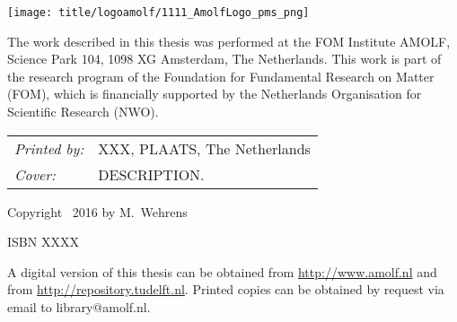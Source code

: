 \begin{titlepage}
\texttt{[image: title/logoamolf/1111\_AmolfLogo\_pms\_png]}


\noindent The work described in this thesis was performed at the FOM Institute AMOLF, Science Park 104, 1098 XG Amsterdam, The Netherlands. This work is part of the research program of the Foundation for Fundamental Research on Matter (FOM), which is financially supported by the Netherlands Organisation for Scientific Research (NWO). 

\vspace{2\bigskipamount}

\noindent
\begin{tabular}{@{}p{}@{}p{}}
    \textit{Printed by:} & XXX, PLAATS, The Netherlands \\[\medskipamount]
    \textit{Cover:} & DESCRIPTION.
\end{tabular}

\vspace{2\bigskipamount} %

\noindent Copyright \textcopyright\ 2016 by M.~Wehrens



\medskip
\noindent ISBN XXXX

\medskip
\noindent A digital version of this thesis can be obtained from \url{http://www.amolf.nl} and from \url{http://repository.tudelft.nl}. Printed copies can be obtained by request via email to library@amolf.nl.


\end{titlepage}

